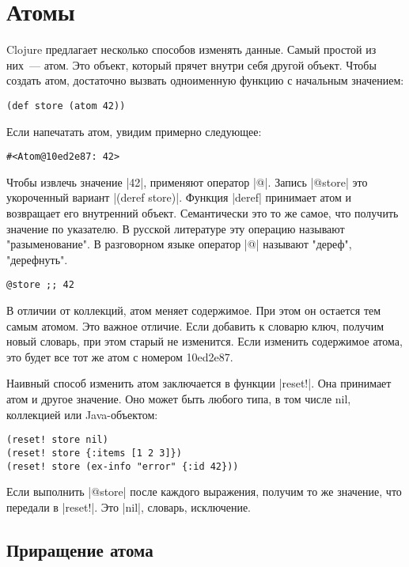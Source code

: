 \section{Атомы}

Clojure предлагает несколько способов изменять данные. Самый простой из них~---
атом. Это объект, который прячет внутри себя другой объект. Чтобы создать атом,
достаточно вызвать одноименную функцию с начальным значением:

\begin{verbatim}
(def store (atom 42))
\end{verbatim}

Если напечатать атом, увидим примерно следующее:

\begin{verbatim}
#<Atom@10ed2e87: 42>
\end{verbatim}

Чтобы извлечь значение \spverb|42|, применяют оператор \spverb|@|. Запись \spverb|@store| это
укороченный вариант \spverb|(deref store)|. Функция \spverb|deref| принимает атом и возвращает
его внутренний объект. Семантически это то же самое, что получить значение по
указателю. В русской литературе эту операцию называют "разыменование". В
разговорном языке оператор \spverb|@| называют "дереф", "дерефнуть".

\begin{verbatim}
@store ;; 42
\end{verbatim}

В отличии от коллекций, атом меняет содержимое. При этом он остается тем самым
атомом. Это важное отличие. Если добавить к словарю ключ, получим новый словарь,
при этом старый не изменится. Если изменить содержимое атома, это будет все тот
же атом с номером 10ed2e87.

Наивный способ изменить атом заключается в функции \spverb|reset!|. Она принимает атом
и другое значение. Оно может быть любого типа, в том числе nil, коллекцией или
Java-объектом:

\begin{verbatim}
(reset! store nil)
(reset! store {:items [1 2 3]})
(reset! store (ex-info "error" {:id 42}))
\end{verbatim}

Если выполнить \spverb|@store| после каждого выражения, получим то же значение, что
передали в \spverb|reset!|. Это \spverb|nil|, словарь, исключение.

\subsection{Приращение атома}


